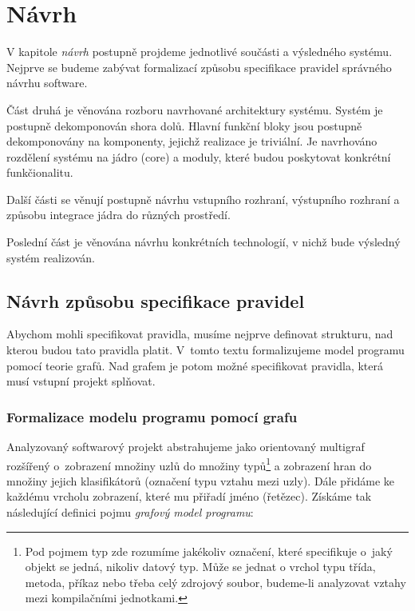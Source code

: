 \chapter{Návrh}
\label{design}
V kapitole \emph{návrh} postupně projdeme jednotlivé součásti a výsledného systému. Nejprve se budeme zabývat formalizací způsobu specifikace pravidel správného návrhu software.

Část druhá je věnována rozboru navrhované architektury systému. Systém je postupně dekomponován shora dolů. Hlavní funkční bloky jsou postupně dekomponovány na komponenty, jejichž realizace je triviální. Je navrhováno rozdělení systému na jádro (core) a moduly, které budou poskytovat konkrétní funkčionalitu.

Další části se věnují postupně návrhu vstupního rozhraní, výstupního rozhraní a způsobu integrace jádra do různých prostředí.

Poslední část je věnována návrhu konkrétních technologií, v nichž bude výsledný systém realizován.

\section{Návrh způsobu specifikace pravidel}

Abychom mohli specifikovat pravidla, musíme nejprve definovat strukturu, nad kterou budou tato pravidla platit. V~tomto textu formalizujeme model programu pomocí teorie grafů. Nad grafem je potom možné specifikovat pravidla, která musí vstupní projekt splňovat.

\subsection{Formalizace modelu programu pomocí grafu}
\label{design-graph_formalization}

Analyzovaný softwarový projekt abstrahujeme jako orientovaný multigraf rozšířený o~zobrazení množiny uzlů do množiny typů\footnote{Pod pojmem typ zde rozumíme jakékoliv označení, které specifikuje o~jaký objekt se jedná, nikoliv datový typ. Může se jednat o vrchol typu třída, metoda, příkaz nebo třeba celý zdrojový soubor, budeme-li analyzovat vztahy mezi kompilačními jednotkami.} a zobrazení hran do množiny jejich klasifikátorů (označení typu vztahu mezi uzly). Dále přidáme ke každému vrcholu zobrazení, které mu přiřadí jméno (řetězec). Získáme tak následující definici pojmu \emph{grafový model programu}:

